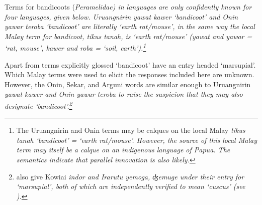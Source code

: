 Terms for bandicoots (\it{Peramelidae}) in 
languages are only confidently known for four languages, given below.
Uruangnirin \it{yawat kawer} ‘bandicoot’
and Onin \it{yawar teroba} ‘bandicoot’ are literally ‘earth rat/mouse’,
in the same way the local Malay term for bandicoot,
\it{tikus tanah}, is ‘earth rat/mouse’ (\it{yawat}
and \it{yawar} = ‘rat,
mouse’, \it{kawer} and \it{roba} = ‘soil, earth’).\footnote{
		The Uruangnirin
		and Onin terms may be calques on the local Malay \it{tikus tanah}
		‘bandicoot’ = ‘earth rat/mouse’.
		However, the source of this local Malay term may itself be
		a calque on an indigenous language of Papua.
		The semantics indicate that
		parallel innovation is also likely.}

Apart from terms explicitly glossed ‘bandicoot’ \citet[237]{SmitsVoorhoeve1992a}
have an entry headed ‘marsupial’.
Which Malay terms were used to elicit the responses included here are unknown.
However, the Onin, Sekar,
and Arguni words are similar enough to Uruangnirin \it{yawat
kawer} and Onin \it{yawar teroba} to raise the suspicion
that they may also designate ‘bandicoot’.\footnote{
		\citet[237]{SmitsVoorhoeve1992a} also give Kowiai \it{indor}
		and Irarutu \it{yemoga}, \it{ʤemuge} under their entry for ‘marsupial’,
		both of which are independently verified to mean ‘cuscus’ (see
		).}
\\


